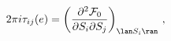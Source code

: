 \begin{equation}
2\pi i\tau _{ij}(e)=\left( \frac{\partial ^{2}{\cal F}_{0}}{\partial
S_{i}\partial S_{j}}\right) _{{\lan S_{i}\ran}}\,,  \label{TAU}
\end{equation}

